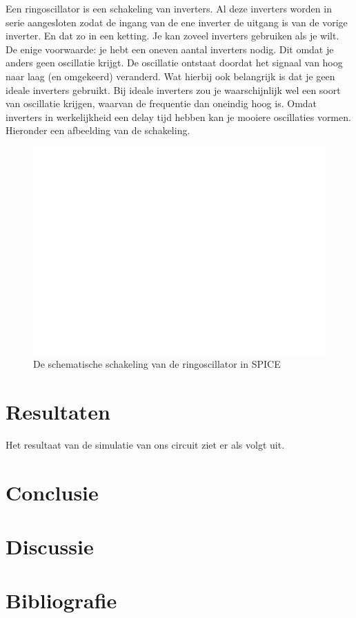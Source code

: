 \documentclass{scrartcl}  %
\begin{document}
Een ringoscillator is een schakeling van inverters. Al deze inverters worden in serie aangesloten zodat de ingang van de ene inverter de uitgang is van de vorige inverter. En dat zo in een ketting. Je kan zoveel inverters gebruiken als je wilt. De enige voorwaarde: je hebt een oneven aantal inverters nodig. Dit omdat je anders geen oscillatie krijgt. De oscillatie ontstaat doordat het signaal van hoog naar laag (en omgekeerd) veranderd. Wat hierbij ook belangrijk is dat je geen ideale inverters gebruikt. Bij ideale inverters zou je waarschijnlijk wel een soort van oscillatie krijgen, waarvan de frequentie dan oneindig hoog is. Omdat inverters in werkelijkheid een delay tijd hebben kan je mooiere oscillaties vormen. Hieronder een afbeelding van de schakeling.
\begin{figure}[H]
\centering
	
	\includegraphics[width=\linewidth]{images/ringoscillator-rc.pdf}
	\caption{De schematische schakeling van de ringoscillator in SPICE}
	\label{fig:Id}
\end{figure}
\section{Resultaten}
Het resultaat van de simulatie van ons circuit ziet er als volgt uit.
\section{Conclusie}


\section{Discussie}


\newpage
{}
\section{Bibliografie}
\printbibliography
\end{document}
